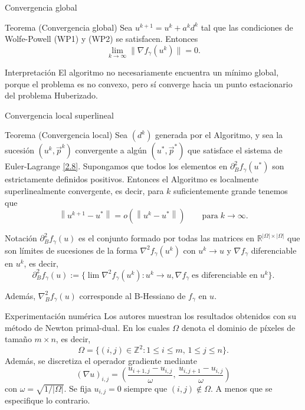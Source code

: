 \documentclass[9pt]{beamer}
\newcommand{\norm}[1]{\left\lVert #1\right\rVert}
\begin{document}
\begin{frame}{Convergencia global}
\begin{block}{Teorema (Convergencia global)}
Sea $u^{k+1}=u^k+a^kd^k$ tal que las condiciones de Wolfe-Powell (WP1) y (WP2) se satisfacen. Entonces 
\[
    \lim_{k\to\infty}\|\nabla f_\gamma(u^k)\|=0.
\]
\end{block}

\begin{alertblock}{Interpretación}
El algoritmo no necesariamente encuentra un mínimo global, porque el problema es no convexo, pero sí converge hacia un punto estacionario del problema Huberizado.
\end{alertblock}
\end{frame}

\begin{frame}{Convergencia local superlineal}
\begin{block}{Teorema (Convergencia local)}
Sea $(d^k)$ generada por el Algoritmo, y sea la sucesión $(u^k,\vec{p}^k)$ convergente a algún $(u^*,\vec{p}^*)$ que satisface el sistema de Euler-Lagrange \eqref{2.8}. Supongamos que todos los elementos en $\partial_{B}^2f_\gamma(u^*)$ son estrictamente definidos positivos. Entonces el Algoritmo es localmente superlinealmente convergente, es decir, para $k$ suficientemente grande tenemos que 
$$
    \norm{u^{k+1}-u^*}=o\left(\norm{u^k-u^*}\right)\qquad\text{para}\;k\to\infty.
$$
\end{block}

\begin{block}{Notación}
$\partial_B^2 f_\gamma(u)$ es el conjunto formado por todas las matrices en $\mathbb{R}^{|\Omega|\times|\Omega|}$ que son límites de sucesiones de la forma $\nabla^2 f_\gamma(u^k)$ con $u^k\to u$ y $\nabla f_\gamma$ diferenciable en $u^k$, es decir, 
   $$ \partial_B^2f_\gamma(u):=\{\lim \nabla^2f_\gamma(u^k):u^k\to u, \nabla f_\gamma\;\text{es diferenciable en}\;u^k\}.$$

Además, $\nabla_B^2f_\gamma(u)$ corresponde al B-Hessiano de $f_\gamma$ en $u$. 
\end{block}
\end{frame}

\begin{frame}{Experimentación numérica}
Los autores muestran los resultados obtenidos con su método de Newton primal-dual. En los cuales $\Omega$ denota el dominio de píxeles de tamaño $m \times n$, es decir, 
\[
\Omega = \{(i,j) \in \mathbb{Z}^2 : 1 \le i \le m, \, 1 \le j \le n\}.
\]
Además, se discretiza el operador gradiente mediante 
\[
(\nabla u)_{i,j} = \left( \frac{u_{i+1,j} - u_{i,j}}{\omega}, \, \frac{u_{i,j+1} - u_{i,j}}{\omega} \right)
\]
con $\omega = \sqrt{1/|\Omega|}$. Se fija $u_{i,j} = 0$ siempre que $(i,j) \notin \Omega$. A menos que se especifique lo contrario.
\end{frame}
\end{document}
